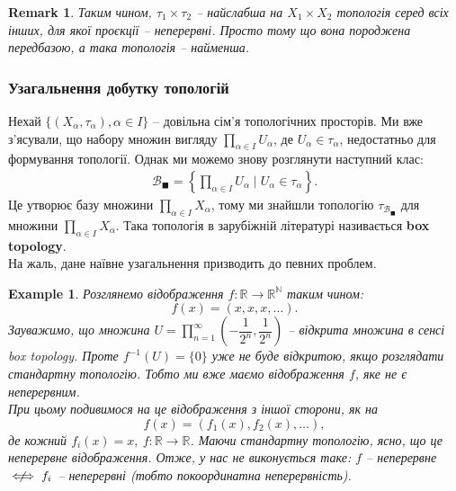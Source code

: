 \documentclass[a4paper, 10pt]{article}
\theoremstyle{theoremdd}
\newtheorem{example}[theorem]{Example}
\newtheorem{remark}[theorem]{Remark}
\begin{document}
\begin{remark}
Таким чином, $\tau_1 \times \tau_2$ -- найслабша на $X_1 \times X_2$ топологія серед всіх інших, для якої проєкції -- неперервні. Просто тому що вона породжена передбазою, а така топологія -- найменша.
\end{remark}

\subsubsection*{Узагальнення добутку топологій}
Нехай $\{(X_\alpha,\tau_\alpha), \alpha \in I \}$ -- довільна сім'я топологічних просторів. Ми вже з'ясували, що набору множин вигляду $\displaystyle\prod_{\alpha \in I} U_\alpha$, де $U_\alpha \in \tau_\alpha$, недостатньо для формування топології. Однак ми можемо знову розглянути наступний клас:
\begin{align*}
\mathcal{B}_{\blacksquare} = \left\{ \prod_{\alpha \in I} U_\alpha \mid U_\alpha \in \tau_\alpha  \right\}.
\end{align*}
Це утворює базу множини $\displaystyle\prod_{\alpha \in I} X_\alpha$, тому ми знайшли топологію $\tau_{\mathcal{B}_{\blacksquare}}$ для множини $\displaystyle\prod_{\alpha \in I} X_\alpha$. Така топологія в зарубіжній літературі називається \textbf{box topology}.\\
На жаль, дане наївне узагальнення призводить до певних проблем.

\begin{example}
Розглянемо відображення $f \colon \mathbb{R} \to \mathbb{R}^{\mathbb{N}}$ таким чином: \[
f(x) = (x,x,x,\dots).
\]
Зауважимо, що множина $U = \displaystyle\prod_{n=1}^\infty \left( -\dfrac{1}{2^n}, \dfrac{1}{2^n} \right)$ -- відкрита множина в сенсі box topology. Проте $f^{-1}(U) = \{0\}$ уже не буде відкритою, якщо розглядати стандартну топологію. Тобто ми вже маємо відображення $f$, яке не є неперервним.\\
При цьому подивимося на це відображення з іншої сторони, як на 
\[
f(x) = (f_1(x),f_2(x),\dots),
\]
де кожний $f_i(x) = x,\ f \colon \mathbb{R} \to \mathbb{R}$. Маючи стандартну топологію, ясно, що це неперервне відображення. Отже, у нас не виконується таке: $f$ -- неперервне $\centernot\iff f_i$ -- неперервні (тобто покоординатна неперервність).
\end{example}
\end{document}
